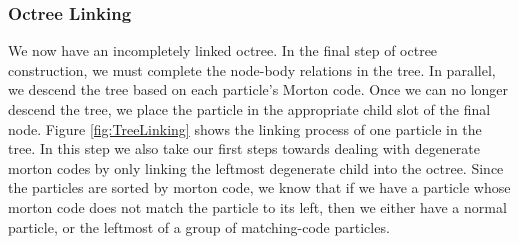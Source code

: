 \documentclass{thesis}
\begin{document}
        

\subsubsection{Octree Linking}
We now have an incompletely linked octree. In the final step of octree construction, we must complete the node-body relations in the tree. In parallel, we descend the tree based on each particle's Morton code. Once we can no longer descend the tree, we place the particle in the appropriate child slot of the final node. Figure \ref{fig:TreeLinking} shows the linking process of one particle in the tree. In this step we also take our first steps towards dealing with degenerate morton codes by only linking the leftmost degenerate child into the octree. Since the particles are sorted by morton code, we know that if we have a particle whose morton code does not match the particle to its left, then we either have a normal particle, or the leftmost of a group of matching-code particles.
\end{document}
